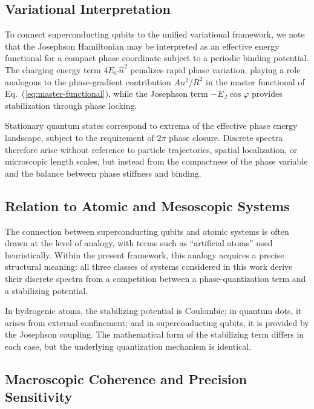 \documentclass[11pt]{article}
\begin{document}
        \subsection{Variational Interpretation}

            To connect superconducting qubits to the unified variational framework, we note that the Josephson Hamiltonian may be interpreted as an effective energy functional for a compact phase coordinate subject to a periodic binding potential. The charging energy term $4E_C \hat{n}^2$ penalizes rapid phase variation, playing a role analogous to the phase-gradient contribution $A n^2/R^2$ in the master functional of Eq.~(\ref{eq:master-functional}), while the Josephson term $-E_J \cos\varphi$ provides stabilization through phase locking.

            Stationary quantum states correspond to extrema of the effective phase energy landscape, subject to the requirement of $2\pi$ phase closure. Discrete spectra therefore arise without reference to particle trajectories, spatial localization, or microscopic length scales, but instead from the compactness of the phase variable and the balance between phase stiffness and binding.

        \subsection{Relation to Atomic and Mesoscopic Systems}

            The connection between superconducting qubits and atomic systems is often drawn at the level of analogy, with terms such as ``artificial atoms'' used heuristically. Within the present framework, this analogy acquires a precise structural meaning: all three classes of systems considered in this work derive their discrete spectra from a competition between a phase-quantization term and a stabilizing potential.

            In hydrogenic atoms, the stabilizing potential is Coulombic; in quantum dots, it arises from external confinement; and in superconducting qubits, it is provided by the Josephson coupling. The mathematical form of the stabilizing term differs in each case, but the underlying quantization mechanism is identical.

        \subsection{Macroscopic Coherence and Precision Sensitivity}
\end{document}
